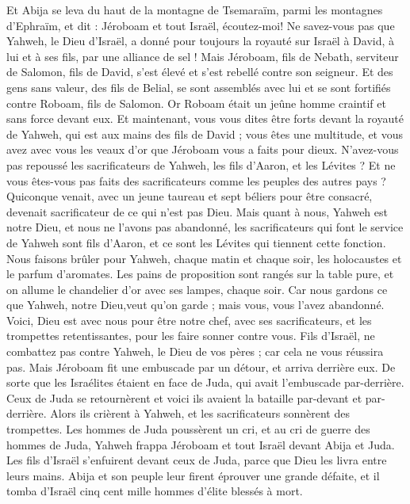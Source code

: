 \begin{multicols}{2}
Et Abija se leva du haut de la montagne de Tsemaraïm, parmi les montagnes d'Ephraïm, et dit : Jéroboam et tout Israël, écoutez-moi!
Ne savez-vous pas que Yahweh, le Dieu d'Israël, a donné pour toujours la royauté sur Israël à David, à lui et à ses fils, par une alliance de sel !
Mais Jéroboam, fils de Nebath, serviteur de Salomon, fils de David, s'est élevé et s'est rebellé contre son seigneur.
Et des gens sans valeur, des fils de Belial, se sont assemblés avec lui et se sont fortifiés contre Roboam, fils de Salomon. Or Roboam était un jeûne homme craintif et sans force devant eux.
Et maintenant, vous vous dites être forts devant la royauté de Yahweh, qui est aux mains des fils de David ; vous êtes une multitude, et vous avez avec vous les veaux d'or que Jéroboam vous a faits pour dieux.
N'avez-vous pas repoussé les sacrificateurs de Yahweh, les fils d'Aaron, et les Lévites ? Et ne vous êtes-vous pas faits des sacrificateurs comme les peuples des autres pays ? Quiconque venait, avec un jeune taureau et sept béliers pour être consacré, devenait sacrificateur de ce qui n'est pas Dieu.
Mais quant à nous, Yahweh est notre Dieu, et nous ne l'avons pas abandonné, les sacrificateurs qui font le service de Yahweh sont fils d'Aaron, et ce sont les Lévites qui tiennent cette fonction.
Nous faisons brûler pour Yahweh, chaque matin et chaque soir, les holocaustes et le parfum d'aromates. Les pains de proposition sont rangés sur la table pure, et on allume le chandelier d'or avec ses lampes, chaque soir. Car nous gardons ce que Yahweh, notre Dieu,veut qu'on garde ; mais vous, vous l'avez abandonné.
Voici, Dieu est avec nous pour être notre chef, avec ses sacrificateurs, et les trompettes retentissantes, pour les faire sonner contre vous. Fils d’Israël, ne combattez pas contre Yahweh, le Dieu de vos pères ; car cela ne vous réussira pas.
Mais Jéroboam fit une embuscade par un détour, et arriva derrière eux. De sorte que les Israélites étaient en face de Juda, qui avait l'embuscade par-derrière.
Ceux de Juda se retournèrent et voici ils avaient la bataille par-devant et par-derrière. Alors ils crièrent à Yahweh, et les sacrificateurs sonnèrent des trompettes.
Les hommes de Juda poussèrent un cri, et au cri de guerre des hommes de Juda, Yahweh frappa Jéroboam et tout Israël devant Abija et Juda.
Les fils d’Israël s'enfuirent devant ceux de Juda, parce que Dieu les livra entre leurs mains.
Abija et son peuple leur firent éprouver une grande défaite, et il tomba d'Israël cinq cent mille hommes d'élite blessés à mort.

\end{multicols}
